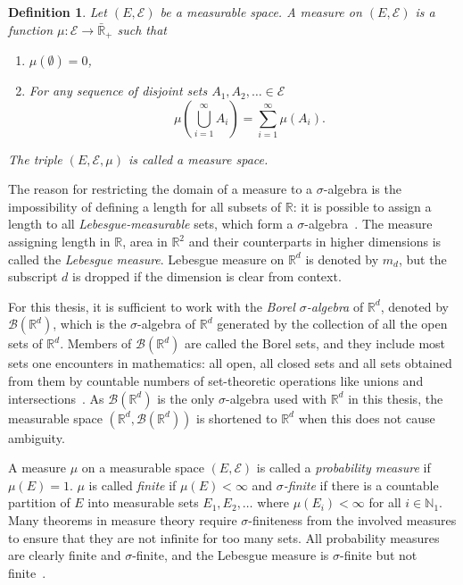 \documentclass[english,twoside,openright]{HYgraduMLDS}
\newtheorem{definition}[lemma]{Definition}
\newcommand{\R}{\mathbb{R}}
\newcommand{\N}{\mathbb{N}}
\begin{document}
\begin{definition}
	Let \((E, \mathcal{E})\) be a measurable space. A measure on \((E, \mathcal{E})\)
  is a function \(\mu\colon \mathcal{E}\to \bar{\R}_{+}\) such that
  \begin{enumerate}
    \item
    \(\mu(\emptyset) = 0\),
    \item
    For any sequence of disjoint sets \(A_{1}, A_{2},\dotsc \in \mathcal{E}\)
    \[
    \quad \mu\left(\bigcup_{i=1}^{\infty} A_{i}\right)
    = \sum_{i=1}^\infty\mu(A_{i}).
    \]
  \end{enumerate}
  The triple \((E, \mathcal{E}, \mu)\) is called a measure space.
\end{definition}

The reason for restricting the domain of a measure to a \(\sigma\)-algebra
is the impossibility of defining a length for all subsets of \(\R\): it is
possible to assign a length to all \emph{Lebesgue-measurable} sets, which form
a \(\sigma\)-algebra~\cite{Cin11}. The measure assigning length in \(\R\),
area in \(\R^{2}\) and their counterparts in higher dimensions is called the
\emph{Lebesgue measure}. Lebesgue measure on \(\R^{d}\) is denoted by
\(m_{d}\), but the subscript \(d\) is dropped if the dimension is clear
from context.

For this thesis, it is sufficient to
work with the \emph{Borel \(\sigma\)-algebra} of \(\R^{d}\), denoted by
\(\mathcal{B}(\R^{d})\), which is
the \(\sigma\)-algebra of \(\R^{d}\) generated by the collection of all the open sets
of \(\R^{d}\). Members of \(\mathcal{B}(\R^{d})\) are called the Borel sets,
and they include most sets one encounters in mathematics: all open, all closed
sets and all sets obtained from them by countable numbers of set-theoretic
operations like unions and intersections~\cite{Cin11}. As \(\mathcal{B}(\R^{d})\) is the
only \(\sigma\)-algebra used with \(\R^{d}\) in this thesis, the measurable space
\((\R^{d}, \mathcal{B}(\R^{d}))\) is shortened to \(\R^{d}\) when this does not
cause ambiguity.

A measure \(\mu\) on a measurable space \((E, \mathcal{E})\) is called
a \emph{probability measure} if \(\mu(E) = 1\). \(\mu\) is called \emph{finite}
if \(\mu(E) < \infty\) and
\emph{\(\sigma\)-finite} if there is a countable partition of \(E\)
into measurable sets \(E_{1}, E_{2},\dotsc\) where \(\mu(E_{i}) < \infty\)
for all \(i\in \N_{1}\).
Many theorems in measure theory require \(\sigma\)-finiteness from the involved
measures to ensure that they are not infinite for too many sets.
All probability measures are clearly finite and \(\sigma\)-finite,
and the Lebesgue measure is \(\sigma\)-finite but not finite~\cite{Cin11}.
\end{document}
